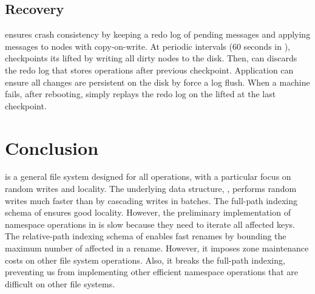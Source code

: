 \subsection{Recovery}
\label{sec:bg:impl:recover}

\Fti ensures crash consistency by keeping a redo log of pending messages and
applying messages to \betrfs nodes with copy-on-write.
At periodic intervals (60 seconds in \betrfs), \fti checkpoints its lifted
\bets by writing all dirty nodes to the disk.
Then, \fti can discards the redo log that stores operations after previous
checkpoint.
Application can ensure all changes are persistent on the disk by force a log
flush.
When a machine fails, after rebooting, \fti simply replays the redo log on the
lifted \bets at the last checkpoint.

\section{Conclusion}

\betrfs is a general file system designed for all operations, with a particular
focus on random writes and locality.
The underlying data structure, \bets, performs random writes much faster than
\btrees by cascading writes in batches.
The full-path indexing schema of \betrfsOne ensures good locality.
However, the preliminary implementation of namespace operations in \betrfsOne
is slow because they need to iterate all affected keys.
The relative-path indexing schema of \betrfsTwo enables fast renames by bounding
the maximum number of affected in a rename.
However, it imposes zone maintenance costs on other file system operations.
Also, it breaks the full-path indexing, preventing us from implementing other
efficient namespace operations that are difficult on other file systems.


